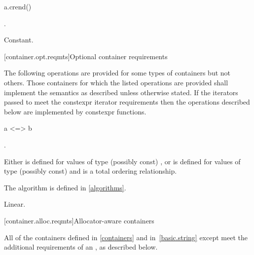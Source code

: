 %
\begin{itemdecl}
a.crend()
\end{itemdecl}

\begin{itemdescr}
\pnum
\result
{}.

\pnum
\returns
{}

\pnum
\complexity
Constant.
\end{itemdescr}


[container.opt.reqmts]{Optional container requirements}

\pnum
The following operations are provided
for some types of containers but not others. Those containers for which the
listed operations are provided shall implement the semantics as described
unless otherwise stated.
If the iterators passed to 
meet the constexpr iterator requirements
then the operations described below
are implemented by constexpr functions.

\begin{itemdecl}
a <=> b
\end{itemdecl}

\begin{itemdescr}
\pnum
\result
{}.

\pnum
\expects
Either \tcode{<=>} is defined for values of type (possibly const) ,
or \tcode{<} is defined for values of type (possibly const)  and
\tcode{<} is a total ordering relationship.

\pnum
\returns
{}
\begin{note}
The algorithm 
is defined in \ref{algorithms}.
\end{note}

\pnum
\complexity
Linear.
\end{itemdescr}

[container.alloc.reqmts]{Allocator-aware containers}

\pnum
All of the containers defined in \ref{containers} and in~\ref{basic.string} except 
meet the additional requirements of an ,
as described below.

